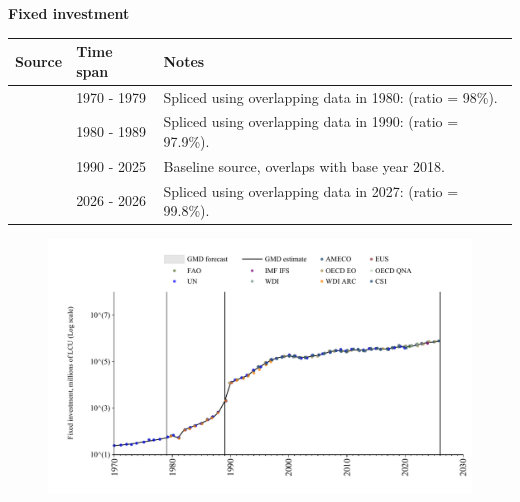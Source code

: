 \documentclass[12pt,a4paper,landscape]{article}
\begin{document}
\begin{adjustbox}{max totalsize={\paperwidth}{\paperheight},center}
\begin{minipage}[t][\textheight][t]{\textwidth}
\vspace*{0.5cm}
{}
\begin{center}
{\Large\bfseries Fixed investment}
\end{center}
\vspace{0.5cm}
\begin{table}[H]
\centering
\small
\begin{tabular}{|l|l|l|}
\hline
\textbf{Source} & \textbf{Time span} & \textbf{Notes} \\
\hline
\rowcolor{white}\cite{UN}& 1970 - 1979 &Spliced using overlapping data in 1980: (ratio = 98\%). \\
\rowcolor{lightgray}\cite{AMECO}& 1980 - 1989 &Spliced using overlapping data in 1990: (ratio = 97.9\%). \\
\rowcolor{white}\cite{OECD_EO}& 1990 - 2025 &Baseline source, overlaps with base year 2018. \\
\rowcolor{lightgray}\cite{AMECO}& 2026 - 2026 &Spliced using overlapping data in 2027: (ratio = 99.8\%). \\
\hline
\end{tabular}
\end{table}
\begin{figure}[H]
\centering
\includegraphics[width=\textwidth,height=0.6\textheight,keepaspectratio]{graphs/POL_finv.pdf}
\end{figure}
\end{minipage}
\end{adjustbox}
\end{document}
